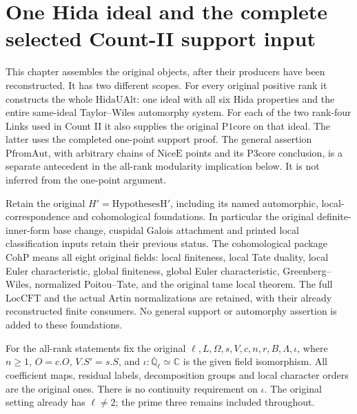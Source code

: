 \section{One Hida ideal and the complete selected Count-II support input}
\label{sec:hida-installation-v45}

This chapter assembles the original objects, after their producers
have been reconstructed.  It has two different scopes.  For every
original positive rank it constructs the whole
\(\mathrm{HidaUAlt}\): one ideal with all six Hida properties
and the entire same-ideal Taylor--Wiles automorphy system.  For
each of the two rank-four Links used in Count II it also supplies
the original \(\mathrm{P1core}\) on that ideal.  The latter uses
the completed one-point support proof.  The general assertion
\(\mathrm{PfromAut}\), with arbitrary chains of
\(\mathrm{NiceE}\) points and its \(\mathrm{P3core}\) conclusion,
is a separate antecedent in the all-rank modularity implication
below.  It is not inferred from the one-point argument.

Retain the original \(H'=\mathrm{HypothesesH}'\), including its
named automorphic, local-correspondence and cohomological
foundations.  In particular the original definite-inner-form
base change, cuspidal Galois attachment and printed local
classification inputs retain their previous status.  The
cohomological package \(\mathrm{CohP}\) means all eight original
fields: local finiteness, local Tate duality, local Euler
characteristic, global finiteness, global Euler characteristic,
Greenberg--Wiles, normalized Poitou--Tate, and the original tame
local theorem.  The full \(\mathrm{LocCFT}\) and the actual
Artin normalizations are retained, with their already reconstructed
finite consumers.  No general support or automorphy assertion is
added to these foundations.

For the all-rank statements fix the original
\(\ell,L,\Omega,s,V,c,n,r,B,\Lambda,\iota\), where
\(n\geq1\), \(O=c.O\), \(V.S'=s.S\), and
\(\iota:\overline{\mathbb Q}_\ell\simeq\mathbb C\) is the
given field isomorphism.  All coefficient maps, residual labels,
decomposition groups and local character orders are the original
ones.  There is no continuity requirement on \(\iota\).
The original setting already has \(\ell\ne2\); the prime three
remains included throughout.

